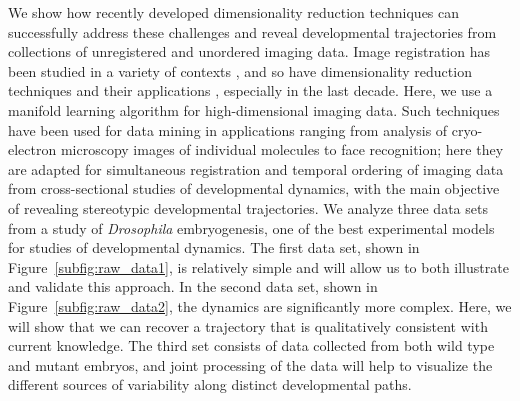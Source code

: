 \documentclass{pnastwo}
\begin{document}
\begin{article}
We show how recently developed dimensionality reduction techniques can successfully address these challenges and reveal developmental trajectories from collections of unregistered and unordered imaging data.
%
Image registration has been studied in a variety of contexts \cite{zitova2003image, rowley1998rotation, hajnal2010medical, greenspan1994rotation, zhao2003face}, and so have dimensionality reduction techniques \cite{Belkin2003, coifman2005geometric, coifman2006geometric, tenenbaum2000global, roweis2000nonlinear} and their applications \cite{anavy2014blind, trapnell2014dynamics,gupta2008extracting, qiu2011discovering, kafri2013dynamics}, especially in the last decade.
%
Here, we use a manifold learning algorithm \cite{singer2012vector} for high-dimensional imaging data.%
%
Such techniques have been used for data mining in
applications ranging from analysis of cryo-electron microscopy images of individual molecules to face recognition; here they are adapted
for simultaneous registration and temporal ordering of imaging data from cross-sectional studies of developmental dynamics, with the main objective of revealing stereotypic developmental trajectories.
%
We analyze three data sets from a study of {\it Drosophila} embryogenesis, one of the best experimental models for studies of developmental dynamics.
%
The first data set, shown in Figure~\ref{subfig:raw_data1}, is relatively simple and will allow us to both illustrate and validate this approach.
%
In the second data set, shown in Figure~\ref{subfig:raw_data2}, the dynamics are significantly more complex.
%
Here, we will show that we can recover a trajectory that is qualitatively consistent with current knowledge.
%
The third set consists of data collected from both wild type and mutant embryos, and joint processing of the data will help to visualize the different sources of variability along distinct developmental paths.

%
%
%
%



\end{article}
\end{document}
